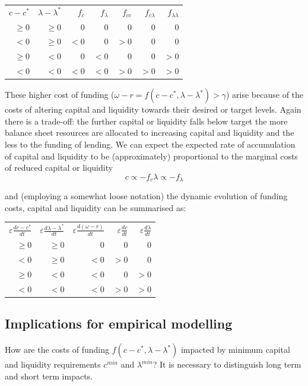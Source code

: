 \documentclass[
]{article}
\begin{document}
\begin{center}
\begin{tabular}{ r r r r r r r}
$c-c^\ast$&$\lambda-\lambda^\ast$&$f_c$&$f_\lambda$&$f_{cc}$&$f_{c\lambda}$&$f_{\lambda\lambda}$\\
$\geq 0$&$\geq 0$&$0$&$0$&$0$&$0$&$0$\\
$<0$&$\geq 0$&$<0$&$0$&$>0$&$0$&$0$\\
$\geq 0$&$<0$&$0$&$<0$&$0$&$0$&$>0$\\
$<0$&$<0$&$<0$&$<0$&$>0$&$>0$&$>0$
\end{tabular}
\end{center}

These higher cost of funding (\(\omega - r = f(c-c^\ast,\lambda-\lambda^\ast )>\gamma\)) arise because of the costs of altering capital and liquidity towards their desired or target levels. Again there is a trade-off: the further capital or liquidity falls below target the more balance sheet resources are allocated to increasing capital and liquidity and the less to the funding of lending. We can expect the expected rate of accumulation of capital and liquidity to be (approximately) proportional to the marginal costs of reduced capital or liquidity
\[
c \propto -f_c
\lambda \propto -f_\lambda
\]

and (employing a somewhat loose notation) the dynamic evolution of funding costs, capital and liquidity can be summarised as:

\begin{center}
\begin{tabular}{ r r r r r}
$\varepsilon\frac{{d}c-c^\ast}{{d}t}$&
$\varepsilon\frac{{d}\lambda-\lambda^\ast}{{d}t}$&
$\varepsilon\frac{{d}(\omega- r)}{{d}t}$&
$\varepsilon\frac{{d}c}{{d}t}$&
$\varepsilon\frac{{d}\lambda}{{d}t} $\\
$\geq 0$&$\geq 0$&$0$&$0$&$0$\\
$<0$&$\geq 0$&$<0$&$>0$&$0$\\
$\geq 0$&$<0$&$<0$&$0$&$>0$\\
$<0$&$<0$&$<0$&$>0$&$>0$
\end{tabular}
\end{center}

\hypertarget{implications-for-empirical-modelling}{%
\subsection{Implications for empirical modelling}\label{implications-for-empirical-modelling}}

How are the costs of funding \(f(c-c^\ast,\lambda-\lambda^\ast)\) impacted by minimum capital and liquidity requirements \(c^{min}\) and \(\lambda^{min}\)? It is necessary to distinguish long term and short term impacts.
\end{document}
